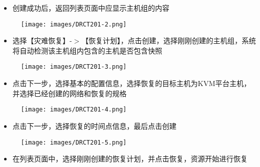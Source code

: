 \begin{itemize}
\item 创建成功后，返回列表页面中应显示主机组的内容

\end{itemize}

\begin{figure}[htbp]
\centering
\texttt{[image: images/DRCT201-2.png]}
\end{figure}

\begin{itemize}
\item 选择【灾难恢复】-$>$【恢复计划】，点击创建，选择刚刚创建的主机组，系统将自动检测该主机组内包含的主机是否包含快照

\end{itemize}

\begin{figure}[htbp]
\centering
\texttt{[image: images/DRCT201-3.png]}
\end{figure}

\begin{itemize}
\item 点击下一步，选择基本的配置信息，选择恢复的目标主机为KVM平台主机，并选择已经创建的网络和恢复的规格

\end{itemize}

\begin{figure}[htbp]
\centering
\texttt{[image: images/DRCT201-4.png]}
\end{figure}

\begin{itemize}
\item 点击下一步，选择恢复的时间点信息，最后点击创建

\end{itemize}

\begin{figure}[htbp]
\centering
\texttt{[image: images/DRCT201-5.png]}
\end{figure}

\begin{itemize}
\item 在列表页面中，选择刚刚创建的恢复计划，并点击恢复，资源开始进行恢复

\end{itemize}

